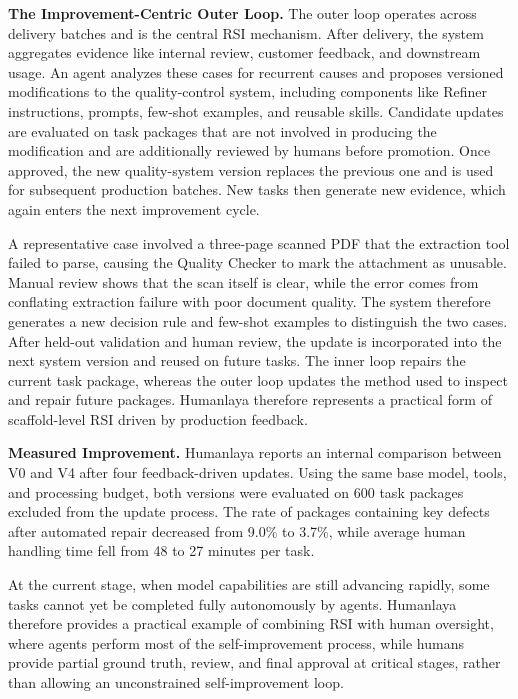 \textbf{The Improvement-Centric Outer Loop.} The outer loop operates across delivery batches and is the central RSI mechanism. After delivery, the system aggregates evidence like internal review, customer feedback, and downstream usage.  An agent analyzes these cases for recurrent causes and proposes versioned modifications to the quality-control system, including components like Refiner instructions, prompts, few-shot examples, and reusable skills. Candidate updates are evaluated on task packages that are not involved in producing the modification and are additionally reviewed by humans before promotion. Once approved, the new quality-system version replaces the previous one and is used for subsequent production batches. New tasks then generate new evidence, which again enters the next improvement cycle.

A representative case involved a three-page scanned PDF that the extraction tool failed to parse, causing the Quality Checker to mark the attachment as unusable. Manual review shows that the scan itself is clear, while the error comes from conflating extraction failure with poor document quality. The system therefore generates a new decision rule and few-shot examples to distinguish the two cases. After held-out validation and human review, the update is incorporated into the next system version and reused on future tasks.
The inner loop repairs the current task package, whereas the outer loop updates the method used to inspect and repair future packages. Humanlaya therefore represents a practical form of scaffold-level RSI driven by production feedback.

\textbf{Measured Improvement.} Humanlaya reports an internal comparison between V0 and V4 after four feedback-driven updates. Using the same base model, tools, and processing budget, both versions were evaluated on 600 task packages excluded from the update process. The rate of packages containing key defects after automated repair decreased from 9.0\% to 3.7\%, while average human handling time fell from 48 to 27 minutes per task. 

At the current stage, when model capabilities are still advancing rapidly, some tasks cannot yet be completed fully autonomously by agents. Humanlaya therefore provides a practical example of combining RSI with human oversight, where agents perform most of the self-improvement process, while humans provide partial ground truth, review, and final approval at critical stages, rather than allowing an unconstrained self-improvement loop.


